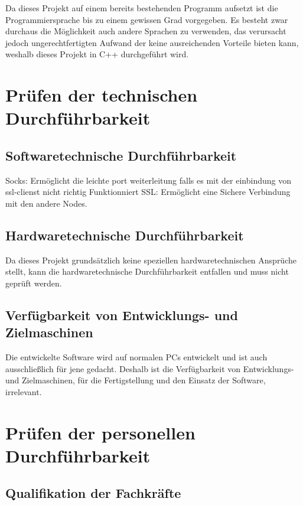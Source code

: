 \documentclass[a4paper,12pt]{scrreprt}
\begin{document}
		Da dieses Projekt auf einem bereits bestehenden Programm aufsetzt ist die Programmiersprache bis zu einem gewissen Grad vorgegeben. Es besteht zwar durchaus die Möglichkeit auch andere Sprachen zu verwenden, das verursacht jedoch ungerechtfertigten Aufwand der keine ausreichenden Vorteile bieten kann, weshalb dieses Projekt in C++ durchgeführt wird.
		
		
		
			
	\section{Pr\"ufen der technischen Durchf\"uhrbarkeit}
		
		\subsection{Softwaretechnische Durchf\"uhrbarkeit}
			Socks: Ermöglicht die leichte port weiterleitung falls es mit der einbindung von ssl-clienst nicht richtig Funktionniert
			SSL: Ermöglicht eine Sichere Verbindung mit den andere Nodes.
			
		\subsection{Hardwaretechnische Durchf\"uhrbarkeit}
			
		Da dieses Projekt grundsätzlich keine speziellen hardwaretechnischen Ansprüche stellt, 
		kann die hardwaretechnische Durchführbarkeit entfallen und muss nicht geprüft werden.
		
			
		\subsection{Verfügbarkeit von Entwicklungs- und Zielmaschinen}
			
		Die entwickelte Software wird auf normalen PCs entwickelt und ist auch ausschließlich für jene gedacht. Deshalb ist die Verfügbarkeit von Entwicklungs- und Zielmaschinen, für die Fertigstellung und den Einsatz der Software, irrelevant.
			
	\section{Pr\"ufen der personellen Durchf\"uhrbarkeit}
		
		\subsection{Qualifikation der Fachkr\"afte}
			
\end{document}
